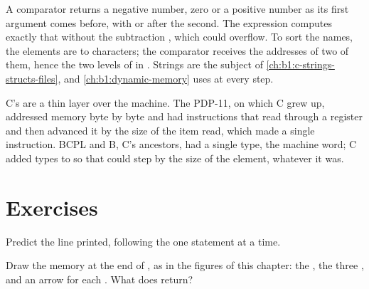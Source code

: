 \label{lst:b1:pointers-and-arrays:qsort}

\label{out:b1:pointers-and-arrays:qsort}

A comparator returns a negative number, zero or a positive number as its first argument comes before, with or after
the second. The expression  computes exactly that without the subtraction ,
which could overflow. To sort the names, the elements are  to characters; the comparator receives the
addresses of two of them, hence the two levels of  in . Strings are the
subject of \cref{ch:b1:c-strings-structs-files}, and \cref{ch:b1:dynamic-memory} uses  at every step.

\begin{history}
C's  are a thin layer over the machine. The PDP-11, on which C grew up, addressed memory byte by byte and had
instructions that read through a register and then advanced it by the size of the item read, which made
 a single instruction. BCPL and B, C's ancestors, had a single type, the machine word; C added types to
 so that  could step by the size of the element, whatever it was.
\end{history}

\section{Exercises}\label{sec:b1:pointers-and-arrays:exercises}

\begin{exercise}[$\star$]\label{exo:b1:pointers-and-arrays:1}
Predict the line printed, following the  one statement at a time.
\end{exercise}

\begin{exercise}[$\star$]\label{exo:b1:pointers-and-arrays:2}
Draw the memory at the end of , as in the figures of this chapter: the , the three , and an
arrow for each . What does  return?
\end{exercise}

